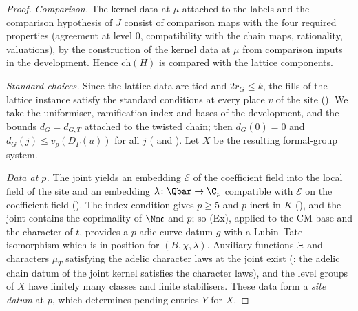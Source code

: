 \begin{proof}
\emph{Comparison.} The kernel data at $\mu$ attached to the labels and the comparison hypothesis of $J$ consist of
comparison maps with the four required properties (agreement at level $0$, compatibility with the chain maps,
rationality, valuations), by the construction of the kernel data at $\mu$ from comparison inputs in the development.
Hence $\mathrm{ch}(H)$ is compared with the lattice components.

\emph{Standard choices.} Since the lattice data are tied and $2r_G\le k$, the fills of the lattice instance satisfy the
standard conditions at every place $v$ of the site (). We take the uniformiser,
ramification index and bases of the development, and the bounds $d_G=d_{G,T}$ attached to the twisted chain; then
$d_G(0)=0$ and $d_G(j)\le v_p(D_\Gamma(u))$ for all $j$ ( and ).
Let $X$ be the resulting formal-group system.

\emph{Data at $p$.} The joint yields an embedding $\mathcal E$ of the coefficient field into the local field of the site and an
embedding $\lambda\colon\Qbar\to\C_p$ compatible with $\mathcal E$ on the coefficient field
(). The index condition gives $p\ge5$ and $p$ inert in $K$
(), and the joint contains the coprimality of $\Nm\mathfrak c$ and $p$; so
\textup{(Ex)}, applied to the CM base and the character of $t$, provides a $p$-adic curve datum $g$ with a Lubin--Tate
isomorphism which is in position for $(B,\chi,\lambda)$. Auxiliary functions $\Xi$ and characters $\mu_T$ satisfying the
adelic character laws at the joint exist (: the adelic
chain datum of the joint kernel satisfies the character laws), and the level groups of $X$ have finitely many classes and
finite stabilisers. These data form a \emph{site datum} at $p$, which determines pending entries $Y$ for $X$.


\end{proof}
